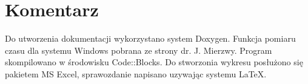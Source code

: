 	 \section{Komentarz}
	 	Do utworzenia dokumentacji wykorzystano system Doxygen.
	 	Funkcja pomiaru czasu dla systemu Windows pobrana ze strony dr. J. Mierzwy. Program skompilowano w środowisku Code::Blocks. Do stworzonia wykresu posłużono się pakietem MS Excel, sprawozdanie napisano uzywając systemu \LaTeX.
